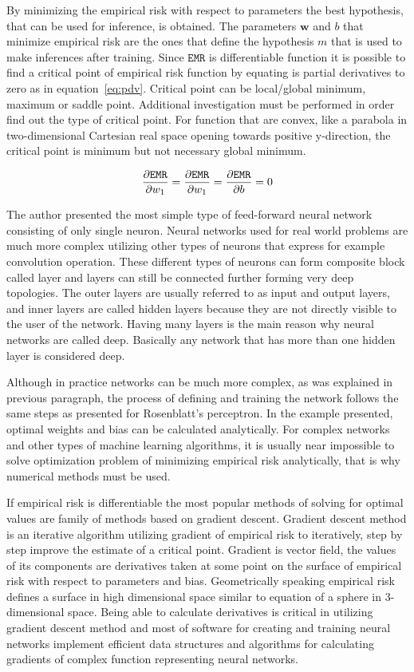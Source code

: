 \documentclass[english, 12pt, a4paper, elec, utf8, online]{aaltothesis}
\begin{document}
By minimizing the empirical risk with respect to parameters the best hypothesis, that can be used for inference, is obtained.
The parameters $\mathbf{w}$ and $b$ that minimize empirical risk are the ones that define the hypothesis $m$ that is used to make inferences after training.  Since $\mathtt{EMR}$ is differentiable function it is possible to find a critical point of empirical risk function by equating is partial derivatives to zero as in equation~\ref{eq:pdv}. Critical point can be local/global minimum, maximum or saddle point. Additional investigation must be performed in order find out the type of critical point. For function that are convex, like a parabola in two-dimensional Cartesian real space opening towards positive y-direction, the critical point is minimum but not necessary global minimum.

\begin{align}\label{eq:pdv}
\pdv{\texttt{EMR}}{w_1} = \pdv{\texttt{EMR}}{w_1} = \pdv{\texttt{EMR}}{b} = 0
\end{align}

The author presented the most simple type of feed-forward neural network consisting of only single neuron. Neural networks used for real world problems are much more complex utilizing other types of neurons that express for example convolution operation. These different types of neurons can form composite block called layer and layers can still be connected further forming very deep topologies. The outer layers are usually referred to as input and output layers, and inner layers are called hidden layers because they are not directly visible to the user of the network. Having many layers is the main reason why neural networks are called deep. Basically any network that has more than one hidden layer is considered deep.  
 
Although in practice networks can be much more complex, as was explained in previous paragraph, the process of defining and training the network follows the same steps as presented for Rosenblatt’s perceptron. In the example presented, optimal weights and bias can be calculated analytically. For complex networks and other types of machine learning algorithms, it is usually near impossible to solve optimization problem of minimizing empirical risk analytically, that is why numerical methods must be used.

If empirical risk is differentiable the most popular methods of solving for optimal values are family of methods based on gradient descent.  Gradient descent method is an iterative algorithm utilizing gradient of empirical risk to iteratively, step by step improve the estimate of a critical point. Gradient is vector field, the values of its components are derivatives taken at some point on the surface of empirical risk with respect to parameters and bias.  Geometrically speaking empirical risk defines a surface in high dimensional space similar to equation of a sphere in 3-dimensional space. Being able to calculate derivatives is critical in utilizing gradient descent method and most of software for creating and training neural networks implement efficient data structures and algorithms for calculating  gradients of complex function representing neural networks.
\end{document}
